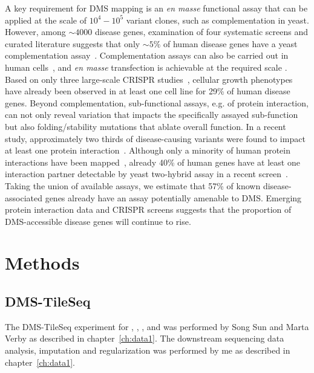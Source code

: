 A key requirement for DMS mapping is an \textit{en masse} functional assay that can be applied at the scale of $10^4-10^5$ variant clones, such as complementation in yeast.  However, among $\sim 4000$ disease genes, examination of four systematic screens and curated literature suggests that only $\sim 5\%$ of human disease genes have a yeast complementation assay~\cite{hamza_complementation_2015,kachroo_systematic_2015,sun_extended_2016}. Complementation assays can also be carried out in human cells~\cite{wagenaar_resistance_2014}, and \textit{en masse} transfection is achievable at the required scale . Based on only three large-scale CRISPR studies~\cite{hart_high-resolution_2015,blomen_gene_2015,wang_genetic_2014}, cellular growth phenotypes have already been observed in at least one cell line for 29\% of human disease genes.  Beyond complementation, sub-functional assays, e.g. of protein interaction, can not only reveal variation that impacts the specifically assayed sub-function but also folding/stability mutations that ablate overall function. In a recent study, approximately two thirds of disease-causing variants were found to impact at least one protein interaction~\cite{sahni_widespread_2015}. Although only a minority of human protein interactions have been mapped~\cite{rolland_proteome-scale_2014}, already 40\% of human genes have at least one interaction partner detectable by yeast two-hybrid assay in a recent screen~\cite{rolland_proteome-scale_2014}. Taking the union of available assays, we estimate that 57\% of known disease-associated genes already have an assay potentially amenable to DMS. Emerging protein interaction data and CRISPR screens suggests that the proportion of DMS-accessible disease genes will continue to rise. 

\section{Methods}

\subsection{DMS-TileSeq}
The DMS-TileSeq experiment for , , , and  was performed by Song Sun and Marta Verby as described in chapter~\ref{ch:data1}. The downstream sequencing data analysis, imputation and regularization was performed by me as described in chapter~\ref{ch:data1}.

